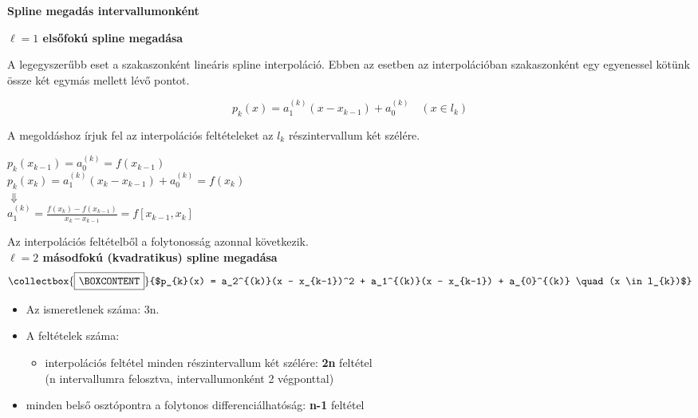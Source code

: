 \documentclass[tikz,12pt,margin=0px]{article}
\newcommand\ddfrac[2]{\frac{\displaystyle #1}{\displaystyle #2}}
\newcommand{\mybox}{%
    \collectbox{%
        \setlength{\fboxsep}{4pt}%
        \fbox{\BOXCONTENT}%
    }%
}
\begin{document}
	\noindent \textbf{Spline megadás intervallumonként\\}


    \noindent \textbf{$\ell = 1$ elsőfokú spline megadása\\}

    \noindent A legegyszerűbb eset a szakaszonként lineáris spline interpoláció. Ebben az esetben az interpolációban szakaszonként egy egyenessel kötünk össze két egymás mellett lévő pontot.

    \[
        p_{k}(x) = a_1^{(k)}(x - x_{k-1}) + a_{0}^{(k)} \quad (x \in l_{k})
    \]

    \noindent A megoldáshoz írjuk fel az interpolációs feltételeket az $l_k$ részintervallum két szélére.

    \begin{center}
        $p_{k}(x_{k-1}) = a_{0}^{(k)} = f(x_{k-1})$\\
        $p_{k}(x_{k}) = a_1^{(k)}(x_{k} - x_{k-1}) + a_{0}^{(k)} = f(x_{k})$\\
        $\Downarrow$\\
        \mybox{$a_{1}^{(k)} = \ddfrac{f(x_{k}) - f(x_{k-1})}{x_{k} - x_{k-1}} = f[x_{k-1}, x_{k}]$}
    \end{center}

    \noindent Az interpolációs feltételből a folytonosság azonnal következik.\\

    \noindent \textbf{$\ell = 2$ másodfokú (kvadratikus) spline megadása\\}
    \[
        \mybox{$p_{k}(x) = a_2^{(k)}(x - x_{k-1})^2 + a_1^{(k)}(x - x_{k-1}) + a_{0}^{(k)} \quad (x \in l_{k})$}
    \]

    \begin{itemize}
        \item Az ismeretlenek száma: 3n.
        \item A feltételek száma:
        \begin{itemize}
            \item interpolációs feltétel minden részintervallum két szélére: \textbf{2n} feltétel\\
            (n intervallumra felosztva, intervallumonként 2 végponttal)
        \end{itemize}
        \item minden belső osztópontra a folytonos differenciálhatóság: \textbf{n-1} feltétel
    \end{itemize}
\end{document}
